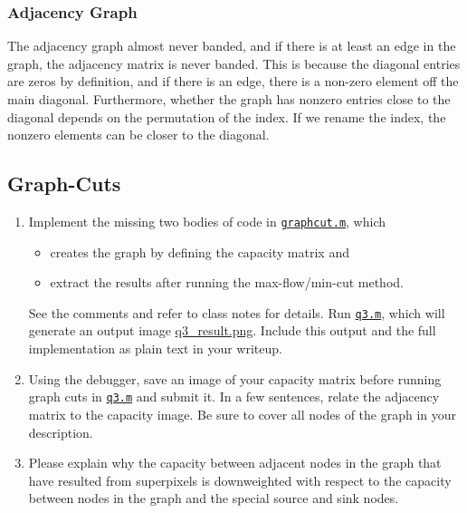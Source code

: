 \subsubsection{Adjacency Graph}
The adjacency graph almost never banded, and if there is at least an edge in the graph, the adjacency matrix is never banded.
This is because the diagonal entries are zeros by definition, and if there is an edge, there is a non-zero element off the main diagonal.
Furthermore, whether the graph has nonzero entries close to the diagonal depends on the permutation of the index.
If we rename the index, the nonzero elements can be closer to the diagonal.


\subsection{Graph-Cuts}
\begin{enumerate}
    \item Implement the missing two bodies of code in \href{./hw5/graphcut.m}{\texttt{graphcut.m}}, which
    \begin{itemize}
    \item creates the graph by defining the capacity matrix and 
    \item extract the results after running the max-flow/min-cut method.
    \end{itemize}
    See the comments and refer to class notes for details.
    Run \href{./hw5/q3.m}{\texttt{q3.m}}, which will generate an output image \href{./hw5/q3_result.png}{q3\_result.png}.
    Include this output and the full implementation as plain
    text in your writeup.
    \item Using the debugger, save an image of your capacity matrix before running graph cuts in \href{./hw5/q3.m}{\texttt{q3.m}} and submit it.
    In a few sentences, relate the adjacency matrix to the capacity image.
    Be sure to cover all nodes of the graph in your description.
    \item Please explain why the capacity between adjacent nodes in the graph that have resulted from superpixels is downweighted with respect to the capacity between nodes in the graph and the special source and sink nodes.
\end{enumerate}
